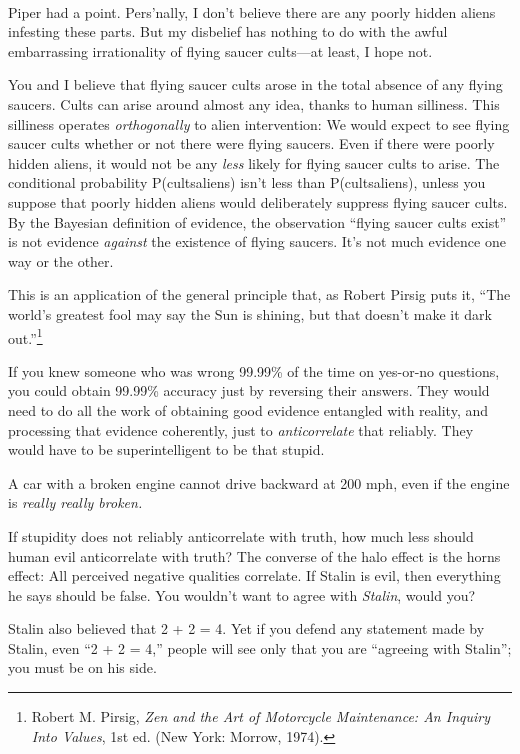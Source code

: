 {
 ~}

{
 Piper had a point. Pers'nally, I
don't believe there are any poorly hidden aliens
infesting these parts. But my disbelief has nothing to do with the
awful embarrassing irrationality of flying saucer cults---at least, I
hope not.}

{
 You and I believe that flying saucer cults arose in the total
absence of any flying saucers. Cults can arise around almost any idea,
thanks to human silliness. This silliness operates
\textit{orthogonally} to alien intervention: We would expect to see
flying saucer cults whether or not there were flying saucers. Even if
there were poorly hidden aliens, it would not be any \textit{less}
likely for flying saucer cults to arise. The conditional probability
P(cults{\textbar}aliens) isn't less than
P(cults{\textbar}{\textlnot}aliens), unless you suppose that poorly
hidden aliens would deliberately suppress flying saucer cults. By the
Bayesian definition of evidence, the observation
``flying saucer cults exist'' is not
evidence \textit{against} the existence of flying saucers.
It's not much evidence one way or the other.}

{
 This is an application of the general principle that, as Robert
Pirsig puts it, ``The world's greatest
fool may say the Sun is shining, but that doesn't make
it dark out.''\footnote{Robert M. Pirsig, \textit{Zen and the Art of Motorcycle
Maintenance: An Inquiry Into Values}, 1st ed. (New York: Morrow,
1974).}}

{
 If you knew someone who was wrong 99.99\% of the time on yes-or-no
questions, you could obtain 99.99\% accuracy just by reversing their
answers. They would need to do all the work of obtaining good evidence
entangled with reality, and processing that evidence coherently, just
to \textit{anticorrelate} that reliably. They would have to be
superintelligent to be that stupid.}

{
 A car with a broken engine cannot drive backward at 200 mph, even
if the engine is \textit{really really broken.}}

{
 If stupidity does not reliably anticorrelate with truth, how much
less should human evil anticorrelate with truth? The converse of the
halo effect is the horns effect: All perceived negative qualities
correlate. If Stalin is evil, then everything he says should be false.
You wouldn't want to agree with \textit{Stalin}, would
you?}

{
 Stalin also believed that 2 + 2 = 4. Yet if you defend any
statement made by Stalin, even ``2 + 2 =
4,'' people will see only that you are
``agreeing with Stalin''; you must
be on his side.}

